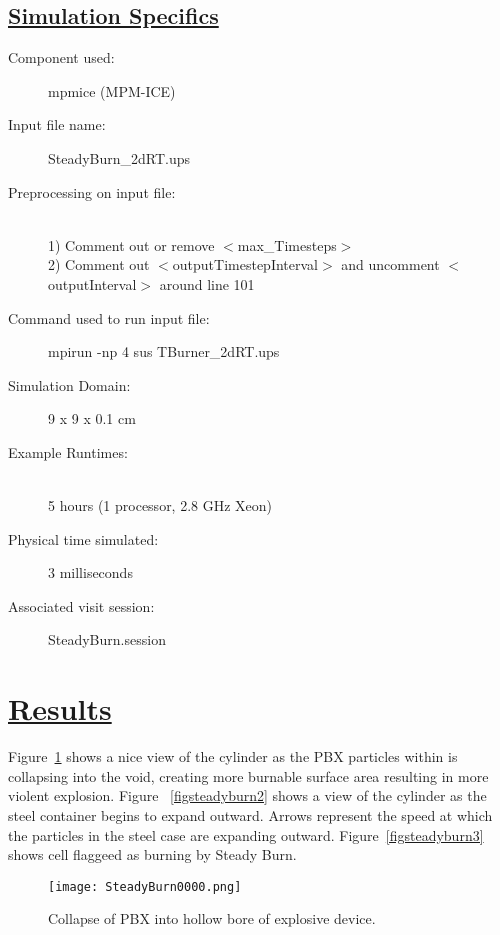 \subsection*{\underline{Simulation Specifics}}
\begin{description}
\item [Component used:] \hfill mpmice (MPM-ICE)
\item [Input file name:] \hfill SteadyBurn\_2dRT.ups
\item [Preprocessing on input file:]\hfill \\ 1) Comment out or remove $<$max\_Timesteps$>$ \\ 2) Comment out $<$outputTimestepInterval$>$ and uncomment $<$outputInterval$>$ around line 101 \\
\item [Command used to run input file:]\hfill mpirun -np 4 sus TBurner\_2dRT.ups

\item [Simulation Domain:]\hfill    9 x 9 x 0.1 cm

\item [Example Runtimes:] \hfill \\
 5 hours   (1 processor, 2.8 GHz Xeon)

\item [Physical time simulated:] \hfill 3 milliseconds \\ 


\item [Associated visit session:] \hfill SteadyBurn.session

\end{description}

\newpage

\section*{\underline{Results}}

Figure~\ref{figsteadyburn1} shows a nice view of the cylinder as the PBX particles within is collapsing into the void, creating  more burnable surface area resulting in more violent explosion.  Figure ~\ref{figsteadyburn2} shows a view of the cylinder as the steel container begins to expand outward.  Arrows represent the speed at which the particles in the steel case are expanding outward.  Figure~\ref{figsteadyburn3} shows cell flaggeed as burning by Steady Burn.

\begin{figure}
  \center
  \texttt{[image: SteadyBurn0000.png]}

  \caption{Collapse of PBX into hollow bore of explosive device.}
  \label{figsteadyburn1}
\end{figure}

